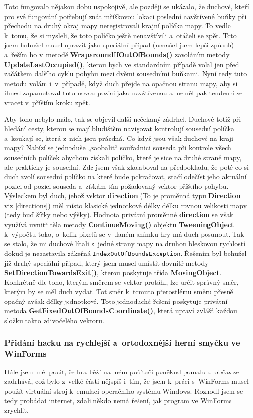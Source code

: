 \documentclass[a4]{article}
\begin{document}
Toto fungovalo nějakou dobu uspokojivě, ale později se ukázalo, že duchové, kteří pro své fungování potřebují znát mřížkovou lokaci poslední navštívené buňky při přechodu na druhý okraj mapy neregistrovali krajní políčka mapy. To vedlo k~tomu, že si mysleli, že toto políčko ještě nenavštívili a~otáčeli se zpět. Toto jsem bohužel musel opravit jako speciální případ (nenašel jsem lepší způsob) a~řeším ho v~metodě \textbf{WraparoundIfOutOfBounds()} zavoláním metody \textbf{UpdateLastOccupied()}, kterou bych ve standardním případě volal jen před začátkem dalšího cyklu pohybu mezi dvěmi sousedními buňkami. Nyní tedy tuto metodu volám i~v~případě, když duch přejde na opačnou stranu mapy, aby si ihned zapamatoval tuto novou pozici jako navštívenou a~neměl pak tendenci se vracet v~příštím kroku zpět.

Aby toho nebylo málo, tak se objevil další nečekaný zádrhel. Duchové totiž při hledání cesty, kterou se mají bludištěm navigovat kontrolují sousední políčka a~koukají se, která z~nich jsou prázdná. Co když jsou však duchové na kraji mapy? Nabízí se jednoduše „zaobalit“ souřadnici souseda při kontrole všech sousedních políček abychom získali políčko, které je sice na druhé straně mapy, ale prakticky je sousední. Zde jsem však zkolaboval na předpokladu, že poté co si duch zvolí sousední políčko na které bude pokračovat, stačí odečíst jeho aktuální pozici od pozici souseda a~získám tím požadovaný vektor příštího pohybu. Výsledkem byl duch, jehož vektor \textbf{direction} (To je proměnná typu \textbf{Direction} viz \ref{directions}) měl místo klasické jednotkové délky délku rovnou velikosti mapy (tedy buď šířky nebo výšky). Hodnota privátní proměnné \textbf{direction} se však využívá uvnitř těla metody \textbf{ContinueMoving()} objektu \textbf{TweeningObject} k~výpočtu toho, o~kolik pixelů se v~daném snímku hry má duch posunout. Tak se stalo, že mi duchové lítali z~jedné strany mapy na druhou bleskovou rychlostí dokud je nezastavila zákeřná \verb|IndexOutOfBoundsException|. Řešením byl bohužel již druhý speciální případ, který jsem musel umístit dovnitř metody \textbf{SetDirectionTowardsExit()}, kterou poskytuje třída \textbf{MovingObject}. Konkrétně dle toho, kterým směrem se vektor protáhl, lze určit správný směr, kterým by se měl duch vydat. Toť směr k~tomuto přerostlému směru přesně opačný avšak délky jednotkové. Toto jednoduché řešení poskytuje privátní metoda \textbf{GetFixedOutOfBoundsCoordinate()}, která upraví zvlášť každou složku takto zdivočelého vektoru.

\subsubsection{Přidání hacku na rychlejší a~ortodoxnější herní smyčku ve WinForms} \label{gameloophack}
Dále jsem měl pocit, že hra běží na mém počítači poněkud pomalu a~občas se zadrhává, což bylo z~velké části nějspíš i~tím, že jsem k~práci s~WinForms musel použít virtuální stroj k~emulaci operačního systému Windows. Rozhodl jsem se tedy probádat internet, zdali někdo nemá řešení, jak program ve WinForms zrychlit. 
\end{document}
